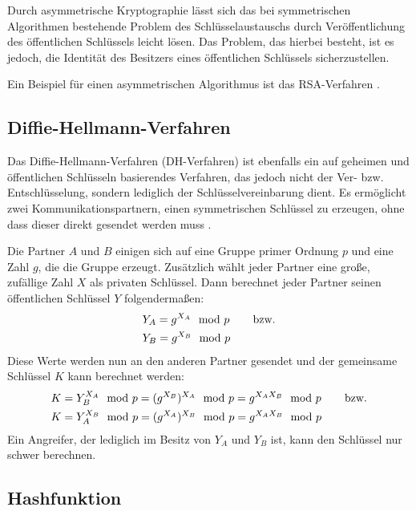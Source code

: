 Durch asymmetrische Kryptographie lässt sich das bei symmetrischen Algorithmen bestehende Problem des Schlüsselaustauschs durch Veröffentlichung des öffentlichen Schlüssels leicht lösen. Das Problem, das hierbei besteht, ist es jedoch, die Identität des Besitzers eines öffentlichen Schlüssels sicherzustellen.

Ein Beispiel für einen asymmetrischen Algorithmus ist das RSA-Verfahren \cite{Schneier2006}.

\subsection{Diffie-Hellmann-Verfahren}

\label{sec_diffie_hellman}

Das Diffie-Hellmann-Verfahren (DH-Verfahren) ist ebenfalls ein auf geheimen und öffentlichen Schlüsseln basierendes Verfahren, das jedoch nicht der Ver- bzw. Entschlüsselung, sondern lediglich der Schlüsselvereinbarung dient. Es ermöglicht zwei Kommunikationspartnern, einen symmetrischen Schlüssel zu erzeugen, ohne dass dieser direkt gesendet werden muss \cite{dh76}. 

Die Partner \(A\) und \(B\) einigen sich auf eine Gruppe primer Ordnung \(p\) und eine Zahl \(g\), die die Gruppe erzeugt. Zusätzlich wählt jeder Partner eine große, zufällige Zahl \(X\) als privaten Schlüssel. Dann berechnet jeder Partner seinen öffentlichen Schlüssel \(Y\) folgendermaßen:
\begin{align*}
&Y_A = g^{X_A} \mod{p} \text{ \hspace{0.5cm} bzw.}\\
&Y_B = g^{X_B} \mod{p}
\end{align*}
Diese Werte werden nun an den anderen Partner gesendet und der gemeinsame Schlüssel \(K\) kann berechnet werden:
\begin{align*}
&K = Y_B^{X_A} \mod{p} = (g^{X_B})^{X_A }\mod{p} = g^{X_A X_B}\mod{p} \text{ \hspace{0.5cm} bzw.}\\
&K = Y_A^{X_B} \mod{p} = (g^{X_A})^{X_B }\mod{p} = g^{X_A X_B}\mod{p} 
\end{align*}
Ein Angreifer, der lediglich im Besitz von \(Y_A\) und \(Y_B\) ist, kann den Schlüssel nur schwer berechnen. 

\subsection{Hashfunktion}

